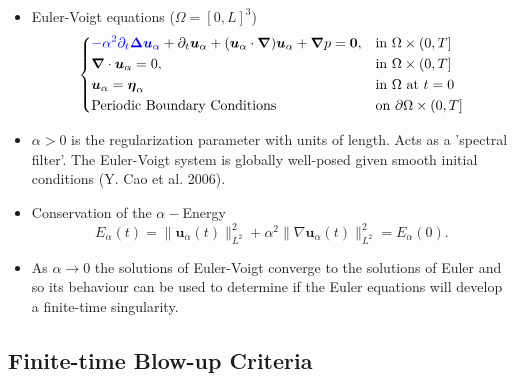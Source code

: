 \documentclass{beamer}
\def\Bmp#1{ \begin{minipage}{#1} }
\def\Emp{ \end{minipage} }
\def\blue#1{{\color{blue}{ #1 }}}
\def\bd{{\boldsymbol \Delta}}
\def\be{{\boldsymbol \eta}}
\def\ua{\boldsymbol u_\alpha}
\def\0{{\mathbf{0}}}
\def\bnabla{\boldsymbol{\nabla}}
\begin{document}
\frame
{
\hspace*{-1.0cm}
\Bmp{12cm}
\raggedright

\begin{itemize}
\item<1->
Euler-Voigt equations ($\Omega = [0,L]^3$)
\small
\begin{equation*}
\left\{
\begin{aligned}
&\blue{-\alpha^2\partial_{t}\bd\ua} +\partial_{t}\ua+({\ua}\cdot{\bnabla}){\ua}
+{\bnabla}{p}=\0,  && \text{in} \ \Omega\times(0,T] \\ 
&{\bnabla}\cdot{\ua}=0,                     && \text{in} \ \Omega\times(0,T] \\ 
&\ua = \be_\alpha                 &&  \text{in} \ \Omega \ \text{at} \ t=0 \\
&\textrm{Periodic Boundary Conditions}                  &&  \text{on} \ \partial\Omega\times(0,T]
\end{aligned}
\right.
\end{equation*}

\item<2->
$\alpha > 0$ is the regularization parameter with units of length. Acts as a 'spectral filter'. The Euler-Voigt system is globally well-posed given smooth initial conditions (Y. Cao et al. 2006). 

\item<3-> Conservation of the $\alpha-$Energy
\begin{equation*}
E_\alpha(t) = \|\ua(t)\|_{L^2}^2 + \alpha^2\|\nabla\ua(t)\|_{L^2}^2 = E_\alpha(0).
\end{equation*}

\item<4->
As $\alpha\rightarrow 0$ the solutions of Euler-Voigt converge to the solutions of Euler and so its behaviour can be used to determine if the Euler equations will develop a finite-time singularity.

\end{itemize}
\Emp
}


\subsection{Finite-time Blow-up Criteria}
\end{document}
